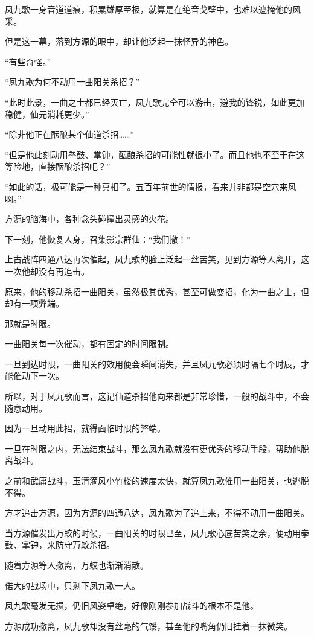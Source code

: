 \begin{this_body}
凤九歌一身音道道痕，积累雄厚至极，就算是在绝音戈壁中，也难以遮掩他的风采。

但是这一幕，落到方源的眼中，却让他泛起一抹怪异的神色。

“有些奇怪。”

“凤九歌为何不动用一曲阳关杀招？”

“此时此景，一曲之士都已经灭亡，凤九歌完全可以游击，避我的锋锐，如此更加稳健，仙元消耗更少。”

“除非他正在酝酿某个仙道杀招……”

“但是他此刻动用拳鼓、掌钟，酝酿杀招的可能性就很小了。而且他也不至于在这等险地，直接酝酿杀招吧？”

“如此的话，极可能是一种真相了。五百年前世的情报，看来并非都是空穴来风啊。”

方源的脑海中，各种念头碰撞出灵感的火花。

下一刻，他恢复人身，召集影宗群仙：“我们撤！”

上古战阵四通八达再次催起，凤九歌的脸上泛起一丝苦笑，见到方源等人离开，这一次他却没有再追击。

原来，他的移动杀招一曲阳关，虽然极其优秀，甚至可做变招，化为一曲之士，但却有一项弊端。

那就是时限。

一曲阳关每一次催动，都有固定的时间限制。

一旦到达时限，一曲阳关的效用便会瞬间消失，并且凤九歌必须时隔七个时辰，才能催动下一次。

所以，对于凤九歌而言，这记仙道杀招他向来都是非常珍惜，一般的战斗中，不会随意动用。

因为一旦动用此招，就得面临时限的弊端。

一旦在时限之内，无法结束战斗，那么凤九歌就没有更优秀的移动手段，帮助他脱离战斗。

之前和武庸战斗，玉清滴风小竹楼的速度太快，就算凤九歌催用一曲阳关，也逃脱不得。

方才追击方源，因为方源的四通八达，凤九歌为了追上来，不得不动用一曲阳关。

当方源催发出万蛟的时候，一曲阳关的时限已至，凤九歌心底苦笑之余，便动用拳鼓、掌钟，来防守万蛟杀招。

随着方源等人撤离，万蛟也渐渐消散。

偌大的战场中，只剩下凤九歌一人。

凤九歌毫发无损，仍旧风姿卓绝，好像刚刚参加战斗的根本不是他。

方源成功撤离，凤九歌却没有丝毫的气馁，甚至他的嘴角仍旧挂着一抹微笑。


\end{this_body}
